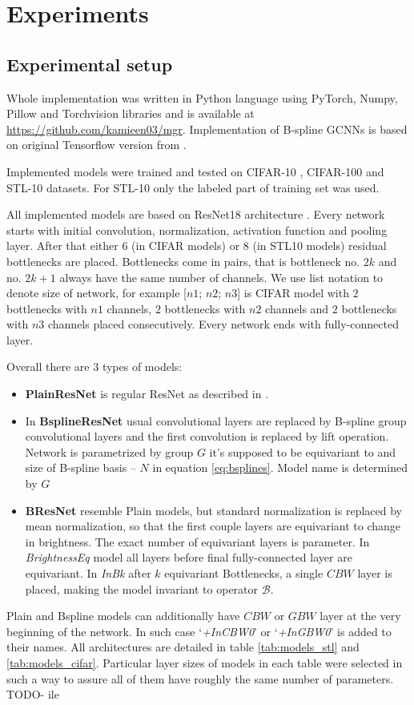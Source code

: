 \section{Experiments}
\subsection{Experimental setup}
Whole implementation was written in Python language using
PyTorch, Numpy, Pillow and Torchvision libraries
and is available at
\url{https://github.com/kamieen03/mgr}.
Implementation
of B-spline GCNNs is based on original Tensorflow version from
\cite{bekkers2019}.

Implemented models were trained and tested on CIFAR-10 \cite{cifar},
CIFAR-100 \cite{cifar} and STL-10 \cite{stl10} datasets.
For STL-10 only the labeled part of training set was used.

All implemented models are based on ResNet18 architecture \cite{resnet}.
Every network starts with initial convolution, normalization, activation
function and pooling layer. After that either $6$ (in CIFAR models)
or $8$ (in STL10 models) residual bottlenecks are
placed. Bottlenecks come in pairs, that is bottleneck no. $2k$ and no. $2k+1$
always have the same number of channels. We use list notation to denote size of
network, for example [$\mathit{n1}$; $\mathit{n2}$; $\mathit{n3}$]
is CIFAR model with $2$ bottlenecks with $n1$ channels, $2$ bottlenecks with
$n2$ channels and $2$ bottlenecks with $n3$ channels placed consecutively.
Every network ends with
fully-connected layer.

Overall there are 3 types of models:
\begin{itemize}
    \item \textbf{PlainResNet} is regular ResNet as described in \cite{resnet}.
    \item In \textbf{BsplineResNet} usual convolutional layers are replaced by
        B-spline group convolutional layers and the first convolution is replaced
        by lift operation. Network is parametrized by group $G$ it's supposed to be
        equivariant to and size of B-spline basis -- $N$ in equation
        \ref{eq:bsplines}. Model name is determined by $G$
    \item \textbf{BResNet} resemble Plain models, but standard normalization is
        replaced by mean normalization, so that the first couple layers are
        equivariant to change in brightness. The exact number of equivariant
        layers is parameter. In \textit{BrightnessEq} model all layers before
        final fully-connected layer are equivariant. In \textit{InBk} after $k$
        equivariant Bottlenecks, a single $CBW$ layer is placed, making the
        model invariant to operator $\mathcal{B}$.
\end{itemize}
Plain and Bspline models can additionally have $\mathit{CBW}$ or $\mathit{GBW}$
layer at the very beginning of the network. In such case `\textit{+InCBW0}' or
`\textit{+InGBW0}' is added to their names. All architectures are detailed in
table \ref{tab:models_stl} and \ref{tab:models_cifar}. Particular layer sizes of
models in each table were selected in such a way to assure all of them have
roughly the same number of parameters. TODO- ile

